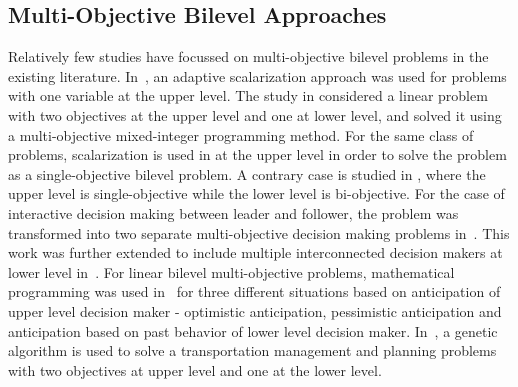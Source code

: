 \subsection{ Multi-Objective Bilevel Approaches}

Relatively few studies have focussed on multi-objective bilevel problems in the existing literature. In~\cite{eichfelder2010multiobjective}, an adaptive scalarization approach was used for problems with one variable at the upper level. The study in \cite{alves2012computing} considered a linear problem with two objectives at the upper level and one at lower level, and solved it using a multi-objective mixed-integer programming method. For the same class of problems, scalarization is used in \cite{calvete2010linear} at the upper level in order to solve the problem as a single-objective bilevel problem. A contrary case is studied in \cite{calvete2011linear}, where the upper level is single-objective while the lower level is bi-objective. For the case of interactive decision making between leader and follower, the problem was transformed into two separate multi-objective decision making problems in~\cite{shi1997interactive}. This work was further extended to include multiple interconnected decision makers at lower level in~\cite{shi2001model}. For linear bilevel multi-objective problems, mathematical programming was used in~\cite{nishizaki1999stackelberg} for three different situations based on anticipation of upper level decision maker - optimistic anticipation, pessimistic anticipation and anticipation based on past behavior of lower level decision maker. In~\cite{yin2002multiobjective}, a genetic algorithm is used to solve a transportation management and planning problems with two objectives at upper level and one at the lower level. 

